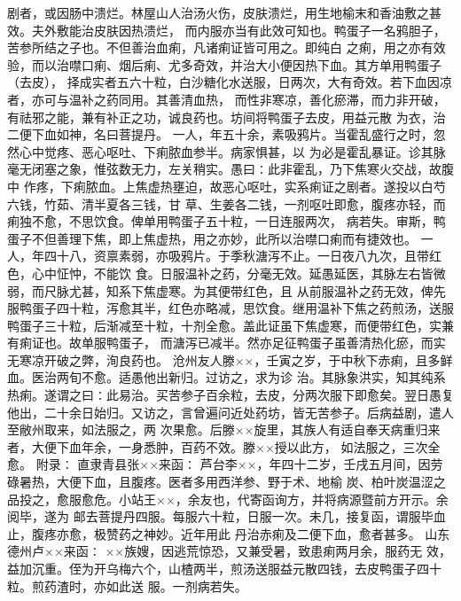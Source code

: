 \documentclass[a4paper,12pt,UTF8,twoside]{ctexbook}
\begin{document}
剧者，或因肠中溃烂。林屋山人治汤火伤，皮肤溃烂，用生地榆末和香油敷之甚效。夫外敷能治皮肤因热溃烂， 
而内服亦当有此效可知也。鸭蛋子一名鸦胆子，苦参所结之子也。不但善治血痢，凡诸痢证皆可用之。即纯白 
之痢，用之亦有效验，而以治噤口痢、烟后痢、尤多奇效，并治大小便因热下血。其方单用鸭蛋子（去皮）， 
择成实者五六十粒，白沙糖化水送服，日两次，大有奇效。若下血因凉者，亦可与温补之药同用。其善清血热， 
而性非寒凉，善化瘀滞，而力非开破，有祛邪之能，兼有补正之功，诚良药也。坊间将鸭蛋子去皮，用益元散 
为衣，治二便下血如神，名曰菩提丹。 
一人，年五十余，素吸鸦片。当霍乱盛行之时，忽然心中觉疼、恶心呕吐、下痢脓血参半。病家惧甚，以 
为必是霍乱暴证。诊其脉毫无闭塞之象，惟弦数无力，左关稍实。愚曰∶此非霍乱，乃下焦寒火交战，故腹中 
作疼，下痢脓血。上焦虚热壅迫，故恶心呕吐，实系痢证之剧者。遂投以白芍六钱，竹茹、清半夏各三钱，甘 
草、生姜各二钱，一剂呕吐即愈，腹疼亦轻，而痢独不愈，不思饮食。俾单用鸭蛋子五十粒，一日连服两次， 
病若失。审斯，鸭蛋子不但善理下焦，即上焦虚热，用之亦妙，此所以治噤口痢而有捷效也。 
一人，年四十八，资禀素弱，亦吸鸦片。于季秋溏泻不止。一日夜八九次，且带红色，心中怔忡，不能饮 
食。日服温补之药，分毫无效。延愚延医，其脉左右皆微弱，而尺脉尤甚，知系下焦虚寒。为其便带红色，且 
从前服温补之药无效，俾先服鸭蛋子四十粒，泻愈其半，红色亦略减，思饮食。继用温补下焦之药煎汤，送服 
鸭蛋子三十粒，后渐减至十粒，十剂全愈。盖此证虽下焦虚寒，而便带红色，实兼有痢证也。故单服鸭蛋子， 
而溏泻已减半。然亦足征鸭蛋子虽善清热化瘀，而实无寒凉开破之弊，洵良药也。 
沧州友人滕××，壬寅之岁，于中秋下赤痢，且多鲜血。医治两旬不愈。适愚他出新归。过访之，求为诊 
治。其脉象洪实，知其纯系热痢。遂谓之曰∶此易治。买苦参子百余粒，去皮，分两次服下即愈矣。翌日愚复 
他出，二十余日始归。又访之，言曾遍问近处药坊，皆无苦参子。后病益剧，遣人至敝州取来，如法服之，两 
次果愈。后滕××旋里，其族人有适自奉天病重归来者，大便下血年余，一身悉肿，百药不效。滕××授以此方， 
如法服之，三次全愈。 
附录∶ 
直隶青县张××来函∶ 
芦台李××，年四十二岁，壬戌五月间，因劳碌暑热，大便下血，且腹疼。医者多用西洋参、野于术、地榆 
炭、柏叶炭温涩之品投之，愈服愈危。小站王××，余友也，代寄函询方，并将病源暨前方开示。余阅毕，遂为 
邮去菩提丹四服。每服六十粒，日服一次。未几，接复函，谓服毕血止，腹疼亦愈，极赞药之神妙。近年用此 
丹治赤痢及二便下血，愈者甚多。 
山东德州卢××来函∶ 
××族嫂，因逃荒惊恐，又兼受暑，致患痢两月余，服药无 
效，益加沉重。侄为开乌梅六个，山楂两半，煎汤送服益元散四钱，去皮鸭蛋子四十粒。煎药渣时，亦如此送 
服。一剂病若失。 
\end{document}
